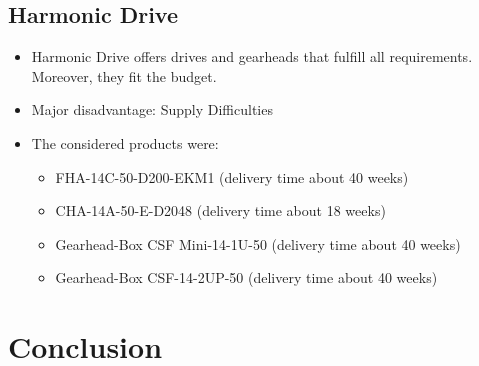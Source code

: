 \documentclass[a4paper]{article}
\begin{document}
\subsection{Harmonic Drive}

\begin{itemize}

\item Harmonic Drive offers drives and gearheads that fulfill all requirements. Moreover, they fit the budget. 

\item Major disadvantage: Supply Difficulties

\item The considered products were:
\begin{itemize}

\item FHA-14C-50-D200-EKM1 (delivery time about 40 weeks)
\item CHA-14A-50-E-D2048 (delivery time about 18 weeks)
\item Gearhead-Box CSF Mini-14-1U-50 (delivery time about 40 weeks)
\item Gearhead-Box CSF-14-2UP-50 (delivery time about 40 weeks)


\end{itemize}

\end{itemize}

{\small


}


\section{Conclusion}

{\small


}
\end{document}

